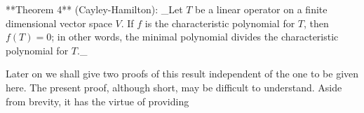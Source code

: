 **Theorem 4** (Cayley-Hamilton): _Let \(T\) be a linear operator on a finite dimensional vector space \(V\). If \(f\) is the characteristic polynomial for \(T\), then \(f(T)=0\); in other words, the minimal polynomial divides the characteristic polynomial for \(T\)._

Later on we shall give two proofs of this result independent of the one to be given here. The present proof, although short, may be difficult to understand. Aside from brevity, it has the virtue of providing 